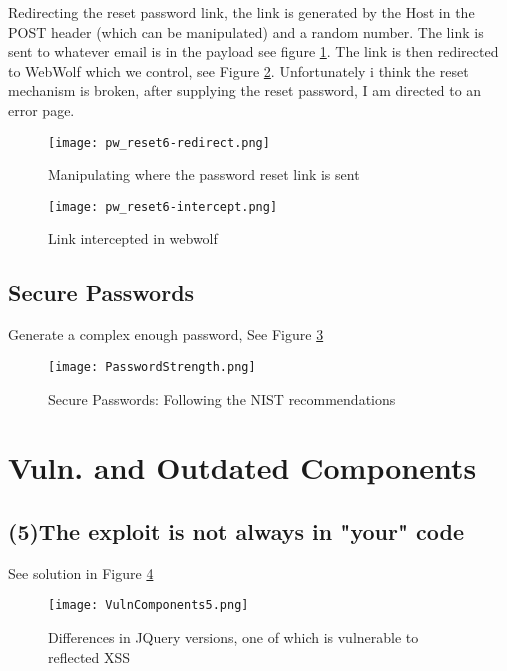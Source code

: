 \documentclass[
	letterpaper, %
	10pt, %
	unnumberedsections, %
	twoside, %
]{APAAssignment}
\begin{document}
\begin{appendices}
Redirecting the reset password link, the link is generated by the Host in the POST header (which can be manipulated) and a  random number. The link is sent to whatever email is in the payload see figure \ref{fig:app:pwreset-redirect}. The link is then redirected to WebWolf which we control, see Figure \ref{fig:app:pwreset-intercept}. Unfortunately i think the reset mechanism is broken, after supplying the reset password, I am directed to an error page. 

\begin{figure}[!htp] %
	\centering
	\texttt{[image: pw\_reset6-redirect.png]}
	\caption{Manipulating where the password reset link is sent}
	\label{fig:app:pwreset-redirect}
\end{figure}

\begin{figure}[!htp] %
	\centering
	\texttt{[image: pw\_reset6-intercept.png]}
	\caption{Link intercepted in webwolf}
	\label{fig:app:pwreset-intercept}
\end{figure}


\subsection{Secure Passwords}
Generate a complex enough password, See Figure \ref{fig:app:SecurePW}

\begin{figure}[!htp] %
	\centering
	\texttt{[image: PasswordStrength.png]}
	\caption{Secure Passwords: Following the NIST recommendations}
	\label{fig:app:SecurePW}
\end{figure}


\section{Vuln. and Outdated Components}\label{app:VulnAndOutdatedComponents}
\subsection{(5)The exploit is not always in "your" code}\label{app:VulnAndOutdatedComponents5}
See solution in Figure \ref{fig:app:vuln5}

\begin{figure}[!ht] %
	\centering
	\texttt{[image: VulnComponents5.png]}
	\caption{Differences in JQuery versions, one of which is vulnerable to reflected XSS }
	\label{fig:app:vuln5}
\end{figure}


\end{appendices}
\end{document}
